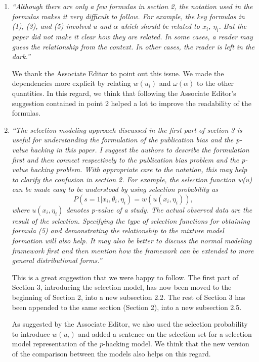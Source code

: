 \documentclass[11pt]{article}
\begin{document}
\begin{enumerate}

\item \emph{``Although there are only a few formulas in section 2, the notation used in the formulas makes it very difficult to follow. For example, the key formulas in (1), (3), and (5) involved $u$ and $\alpha$ which should be related to $x_i$, $\eta_i$. But the paper did not make it clear how they are related. In some cases, a reader may guess the relationship from the context. In other cases, the reader is left in the dark.''}


We thank the Associate Editor to point out this issue. We made the dependencies more explicit by relating $w(u_i)$ and $\omega(\alpha)$ to the other quantities. In this regard, we think that following the Associate Editor's suggestion contained in point 2 helped a lot to improve the readability of the formulas.



\item \emph{``The selection modeling approach discussed in the first part of section 3 is useful for understanding the formulation of the publication bias and the p-value hacking in this paper. I suggest the authors to describe the formulation first and then connect respectively to the publication bias problem and the p-value hacking problem. With appropriate care to the notation, this may help to clarify the confusion in section 2. For example, the selection function w(u) can be made easy to be understood by using selection probability as
$$
P(s = 1 | x_i, \theta_i, \eta_i) = w(u(x_i, \eta_i)),
$$
where $u(x_i, \eta_i)$ denotes p-value of a study. The actual observed data are the result of the selection. Specifying the type of selection functions for obtaining formula (5) and demonstrating the relationship to the mixture model formation will also help. It may also be better to discuss the normal modeling framework first and then mention how the framework can be extended to more general distributional forms.''}


This is a great suggestion that we were happy to follow. The first part of Section 3, introducing the selection model, has now been moved to the beginning of Section 2, into a new subsection 2.2. The rest of Section 3 has been appended to the same section (Section 2), into a new subsection 2.5.

As suggested by the Associate Editor, we also used the selection probability to introduce $w(u_i)$ and added a sentence on the selection set for a selection model representation of the $p$-hacking model. We think that the new version of the comparison between the models also helps on this regard.




\end{enumerate}
\end{document}
